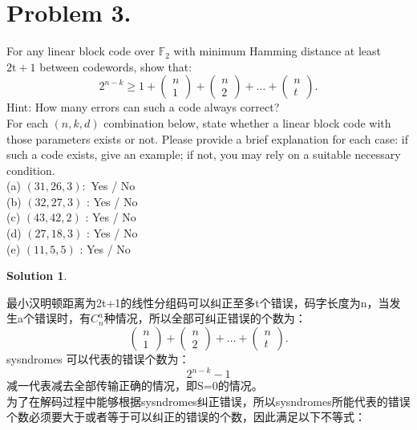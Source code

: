 \documentclass[UTF8,oneside]{article}
\newtheorem*{Solution}{Solution}
\begin{document}
\section*{Problem 3.}
For any linear block code over $\mathbb{F}_{2}$ with minimum Hamming distance at least $2 \mathrm{t}+1$ between codewords, show that:
$$
2^{n-k} \geq 1+\left(\begin{array}{l}
n \\
1
\end{array}\right)+\left(\begin{array}{l}
n \\
2
\end{array}\right)+\ldots+\left(\begin{array}{l}
n \\
t
\end{array}\right) .
$$
Hint: How many errors can such a code always correct?\\
For each $(n, k, d)$ combination below, state whether a linear block code with those parameters exists or not. Please provide a brief explanation for each case: if such a code exists, give an example; if not, you may rely on a suitable necessary condition.\\
(a) $(31,26,3):$ Yes / No\\
(b) $(32,27,3)$ : Yes / No\\
(c) $(43,42,2)$ : Yes / No\\
(d) $(27,18,3)$ : Yes / No\\
(e) $(11,5,5)$ : Yes / No\\
\begin{Solution}
\end{Solution}
最小汉明顿距离为2t+1的线性分组码可以纠正至多t个错误，码字长度为n，当发生a个错误时，有$C_{n}^{a}$种情况，所以全部可纠正错误的个数为： 
$$\left(\begin{array}{l}
n \\
1
\end{array}\right)+\left(\begin{array}{l}
n \\
2
\end{array}\right)+\ldots+\left(\begin{array}{l}
n \\
t
\end{array}\right) .$$
sysndromes 可以代表的错误个数为：
$$2^{n-k}-1$$
减一代表减去全部传输正确的情况，即S=0的情况。\\
为了在解码过程中能够根据sysndromes纠正错误，所以sysndromes所能代表的错误个数必须要大于或者等于可以纠正的错误的个数，因此满足以下不等式：
\end{document}
